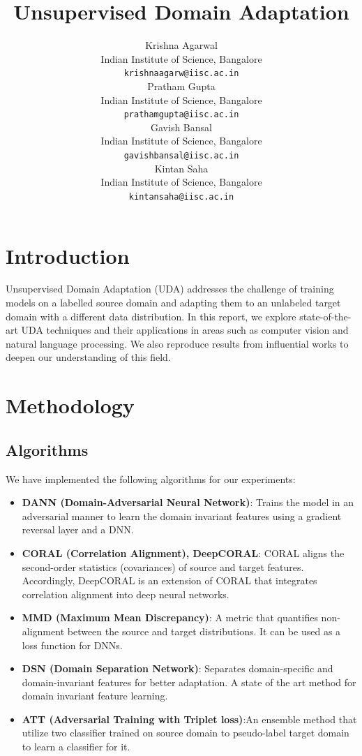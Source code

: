 \documentclass{article}
\title{Unsupervised Domain Adaptation}
\author{ Krishna Agarwal\\%
  Indian Institute of Science, Bangalore\\
  \texttt{krishnaagarw@iisc.ac.in} \\
   \And
  {Pratham Gupta} \\
  Indian Institute of Science, Bangalore\\
  \texttt{prathamgupta@iisc.ac.in} \\
   \And
   {Gavish Bansal} \\
   Indian Institute of Science, Bangalore\\
   \texttt{gavishbansal@iisc.ac.in} \\
   \And
   {Kintan Saha} \\
   Indian Institute of Science, Bangalore\\
   \texttt{kintansaha@iisc.ac.in} \\
}
\begin{document}
\graphicspath{{./images/}}

\maketitle


\begin{abstract}
  
\end{abstract}


\section{Introduction}
Unsupervised Domain Adaptation (UDA) addresses the challenge of training models on a labelled source domain and adapting them to an unlabeled target domain with a different data distribution. In this report, we explore state-of-the-art UDA techniques and their applications in areas such as computer vision and natural language processing. We also reproduce results from influential works \cite{ganin2016domainadversarialtrainingneuralnetworks,survey,Ben-David2010} to deepen our understanding of this field.

\section{Methodology}

\subsection{Algorithms}
We have implemented the following algorithms for our experiments:
\begin{itemize}
  \item \textbf{DANN (Domain-Adversarial Neural Network)}\cite{ganin2016domainadversarialtrainingneuralnetworks}: Trains the model in an adversarial manner to learn the domain invariant features using a gradient reversal layer and a DNN.
  \item \textbf{CORAL (Correlation Alignment), DeepCORAL}\cite{Coral,DeepCoral}: CORAL aligns the second-order statistics (covariances) of source and target features. Accordingly, DeepCORAL is an extension of CORAL that integrates correlation alignment into deep neural networks.
  \item \textbf{MMD (Maximum Mean Discrepancy)}\cite{sutherland2017generative}: A metric that quantifies non-alignment between the source and target distributions. It can be used as a loss function for DNNs.
  \item \textbf{DSN (Domain Separation Network)}\cite{DSN}: Separates domain-specific and domain-invariant features for better adaptation. A state of the art method for domain invariant feature learning.
  \item \textbf{ATT (Adversarial Training with Triplet loss)}\cite{pmlr-v70-saito17a}:An ensemble method that utilize two classifier trained on source domain to pseudo-label target domain to learn a classifier for it.
\end{itemize}
\end{document}
